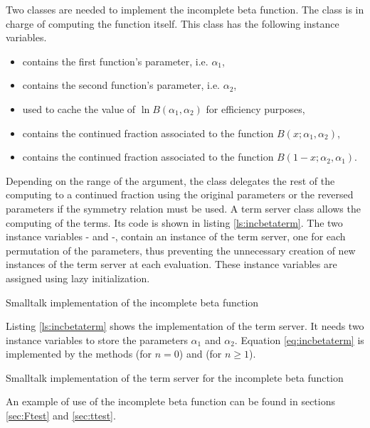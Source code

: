 Two classes are needed to implement the incomplete beta function.
The class  is in charge of
computing the function itself. This class has the following
instance variables.
\begin{itemize}
\item {} contains the first function's parameter, i.e.
$\alpha_1$,
\item {} contains the second function's parameter, i.e.
$\alpha_2$,
\item {} used to cache the value of $\ln B\left(\alpha_1,\alpha_2\right)$ for efficiency purposes,
\item {} contains the continued fraction associated to the
function $B\left(x;\alpha_1,\alpha_2\right)$,
\item {} contains the continued fraction associated to the
function $B\left(1-x;\alpha_2,\alpha_1\right)$.
\end{itemize}
Depending on the range of the argument, the class delegates the
rest of the computing to a continued fraction using the original
parameters or the reversed parameters if the symmetry relation
must be used. A term server class allows the computing of the
terms. Its code is shown in listing \ref{ls:incbetaterm}. The two
instance variables -  and  -,
contain an instance of the term server, one for each permutation
of the parameters, thus preventing the unnecessary creation of new
instances of the term server at each evaluation. These instance
variables are assigned using lazy initialization.
\begin{listing} Smalltalk implementation of the incomplete beta function
\label{ls:incbeta}

\end{listing}
Listing \ref{ls:incbetaterm} shows the implementation of the term
server. It needs two instance variables to store the parameters
$\alpha_1$ and $\alpha_2$. Equation \ref{eq:incbetaterm} is
implemented by the methods  (for $n=0$) and  (for $n\ge 1$).
\begin{listing} Smalltalk implementation of the term server for the incomplete beta function
\label{ls:incbetaterm}

\end{listing}
An example of use of the incomplete beta function can be found in
sections \ref{sec:Ftest} and \ref{sec:ttest}.


